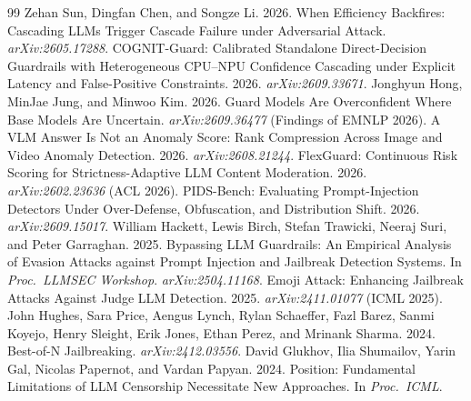 \documentclass[11pt]{article}
\begin{document}
\begin{thebibliography}{99}
 Zehan Sun, Dingfan Chen, and Songze Li. 2026. When Efficiency Backfires: Cascading LLMs Trigger Cascade Failure under Adversarial Attack. \emph{arXiv:2605.17288}.
 COGNIT-Guard: Calibrated Standalone Direct-Decision Guardrails with Heterogeneous CPU--NPU Confidence Cascading under Explicit Latency and False-Positive Constraints. 2026. \emph{arXiv:2609.33671}.
 Jonghyun Hong, MinJae Jung, and Minwoo Kim. 2026. Guard Models Are Overconfident Where Base Models Are Uncertain. \emph{arXiv:2609.36477} (Findings of EMNLP 2026).
 A VLM Answer Is Not an Anomaly Score: Rank Compression Across Image and Video Anomaly Detection. 2026. \emph{arXiv:2608.21244}.
 FlexGuard: Continuous Risk Scoring for Strictness-Adaptive LLM Content Moderation. 2026. \emph{arXiv:2602.23636} (ACL 2026).
 PIDS-Bench: Evaluating Prompt-Injection Detectors Under Over-Defense, Obfuscation, and Distribution Shift. 2026. \emph{arXiv:2609.15017}.
 William Hackett, Lewis Birch, Stefan Trawicki, Neeraj Suri, and Peter Garraghan. 2025. Bypassing LLM Guardrails: An Empirical Analysis of Evasion Attacks against Prompt Injection and Jailbreak Detection Systems. In \emph{Proc.\ LLMSEC Workshop}. \emph{arXiv:2504.11168}.
 Emoji Attack: Enhancing Jailbreak Attacks Against Judge LLM Detection. 2025. \emph{arXiv:2411.01077} (ICML 2025).
 John Hughes, Sara Price, Aengus Lynch, Rylan Schaeffer, Fazl Barez, Sanmi Koyejo, Henry Sleight, Erik Jones, Ethan Perez, and Mrinank Sharma. 2024. Best-of-N Jailbreaking. \emph{arXiv:2412.03556}.
 David Glukhov, Ilia Shumailov, Yarin Gal, Nicolas Papernot, and Vardan Papyan. 2024. Position: Fundamental Limitations of LLM Censorship Necessitate New Approaches. In \emph{Proc.\ ICML}.
\end{thebibliography}
\end{document}
